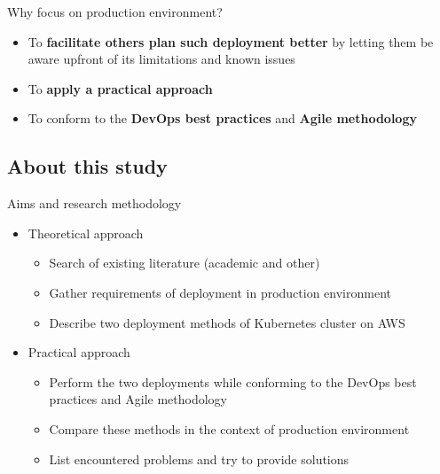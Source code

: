 \documentclass{beamer}
\begin{document}
\begin{frame}{Why focus on production environment?}%
	\begin{itemize}
		\item To \textbf{facilitate others plan such deployment better} by letting them be aware upfront of its limitations and known issues
		\item To \textbf{apply a practical approach}
		\item To conform to the \textbf{DevOps best practices} and \textbf{Agile methodology}
	\end{itemize}
\end{frame}

\subsection{About this study}
\begin{frame}{Aims and research methodology}%
	\begin{itemize}
		\item Theoretical approach
		\begin{itemize}
			\item Search of existing literature (academic and other)
			\item Gather requirements of deployment in production environment
			\item Describe two deployment methods of Kubernetes cluster on AWS
		\end{itemize}
		\item Practical approach
		\begin{itemize}
			\item Perform the two deployments while conforming to the DevOps best practices and Agile methodology
			\item Compare these methods in the context of production environment
			\item List encountered problems and try to provide solutions
		\end{itemize}
	\end{itemize}
\end{frame}
\end{document}
